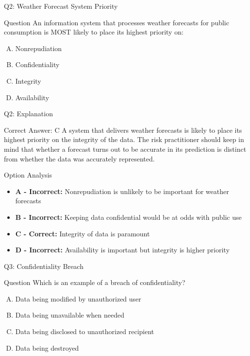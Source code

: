 \documentclass{beamer}
\begin{document}
	\begin{frame}{Q2: Weather Forecast System Priority}
		\begin{block}{Question}
			An information system that processes weather forecasts for public consumption is MOST likely to place its highest priority on:
		\end{block}
		\begin{enumerate}[(A)]
			\item Nonrepudiation
			\item Confidentiality
			\item Integrity
			\item Availability
		\end{enumerate}
	\end{frame}
	
	\begin{frame}{Q2: Explanation}
		\begin{block}{Correct Answer: C}
			A system that delivers weather forecasts is likely to place its highest priority on the integrity of the data. The risk practitioner should keep in mind that whether a forecast turns out to be accurate in its prediction is distinct from whether the data was accurately represented.
		\end{block}
		\begin{block}{Option Analysis}
			\begin{itemize}
				\item \textbf{A - Incorrect:} Nonrepudiation is unlikely to be important for weather forecasts
				\item \textbf{B - Incorrect:} Keeping data confidential would be at odds with public use
				\item \textbf{C - Correct:} Integrity of data is paramount
				\item \textbf{D - Incorrect:} Availability is important but integrity is higher priority
			\end{itemize}
		\end{block}
	\end{frame}
	
	\begin{frame}{Q3: Confidentiality Breach}
		\begin{block}{Question}
			Which is an example of a breach of confidentiality?
		\end{block}
		\begin{enumerate}[(A)]
			\item Data being modified by unauthorized user
			\item Data being unavailable when needed
			\item Data being disclosed to unauthorized recipient
			\item Data being destroyed
		\end{enumerate}
	\end{frame}
	
\end{document}
